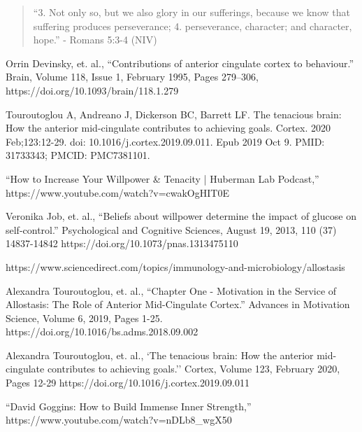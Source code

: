 \documentclass[9.5pt]{article}
\begin{document}
\begin{multicols}{2}
\begin{quotation}
``3. Not only so, but we also glory in our sufferings, because we know that suffering produces perseverance; 4. perseverance, character; and character, hope.'' - Romans 5:3-4 (NIV)
\end{quotation}

\begin{thebibliography}{9}
	{\footnotesize
	
	 Orrin Devinsky, et. al., ``Contributions of anterior cingulate cortex to behaviour.'' Brain, Volume 118, Issue 1, February 1995, Pages 279–306, https://doi.org/10.1093/brain/118.1.279
	
	 Touroutoglou A, Andreano J, Dickerson BC, Barrett LF. The tenacious brain: How the anterior mid-cingulate contributes to achieving goals. Cortex. 2020 Feb;123:12-29. doi: 10.1016/j.cortex.2019.09.011. Epub 2019 Oct 9. PMID: 31733343; PMCID: PMC7381101.
		
	 ``How to Increase Your Willpower \& Tenacity | Huberman Lab Podcast,'' https://www.youtube.com/watch?v=cwakOgHIT0E
	
	 Veronika Job, et. al., ``Beliefs about willpower determine the impact of glucose on self-control.'' Psychological and Cognitive Sciences, August 19, 2013, 110 (37) 14837-14842 https://doi.org/10.1073/pnas.1313475110
	
	 https://www.sciencedirect.com/topics/immunology-and-microbiology/allostasis
	
	 Alexandra Touroutoglou, et. al., ``Chapter One - Motivation in the Service of Allostasis: The Role of Anterior Mid-Cingulate Cortex.'' Advances in Motivation Science, Volume 6, 2019, Pages 1-25. https://doi.org/10.1016/bs.adms.2018.09.002
	
	 Alexandra Touroutoglou, et. al., `The tenacious brain: How the anterior mid-cingulate contributes to achieving goals.'' Cortex,	Volume 123, February 2020, Pages 12-29 https://doi.org/10.1016/j.cortex.2019.09.011
			
	 ``David Goggins: How to Build Immense Inner Strength,'' https://www.youtube.com/watch?v=nDLb8\_wgX50
	}
\end{thebibliography}

\end{multicols}

\end{document}
